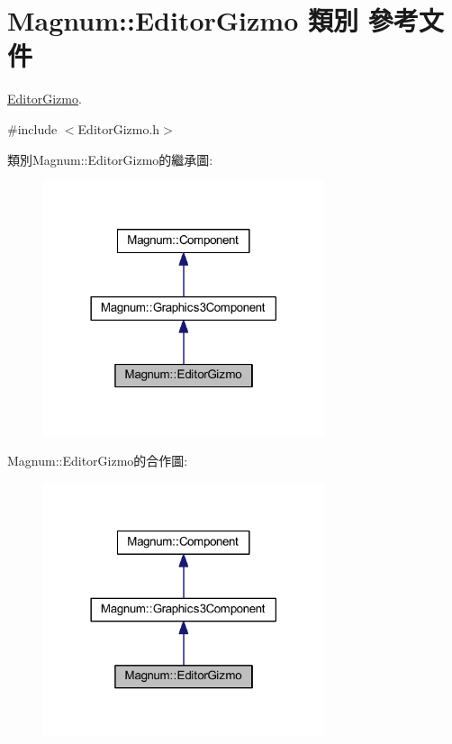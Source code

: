 \hypertarget{class_magnum_1_1_editor_gizmo}{}\section{Magnum\+:\+:Editor\+Gizmo 類別 參考文件}
\label{class_magnum_1_1_editor_gizmo}


\hyperlink{class_magnum_1_1_editor_gizmo}{Editor\+Gizmo}.  




{\ttfamily \#include $<$Editor\+Gizmo.\+h$>$}



類別\+Magnum\+:\+:Editor\+Gizmo的繼承圖\+:\nopagebreak
\begin{figure}[H]
\begin{center}
\leavevmode
\includegraphics[width=234pt]{class_magnum_1_1_editor_gizmo__inherit__graph}
\end{center}
\end{figure}


Magnum\+:\+:Editor\+Gizmo的合作圖\+:\nopagebreak
\begin{figure}[H]
\begin{center}
\leavevmode
\includegraphics[width=234pt]{class_magnum_1_1_editor_gizmo__coll__graph}
\end{center}
\end{figure}
